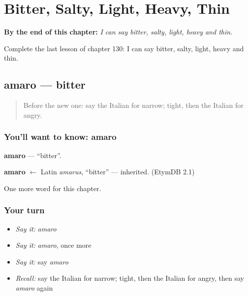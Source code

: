 
\chapter{Bitter, Salty, Light, Heavy, Thin}
\label{ch:it-bitter-salty-light-heavy-thin}

\begin{chapteropening}
\textbf{By the end of this chapter:} \emph{I can say bitter, salty, light, heavy and thin.}

Complete the last lesson of chapter 130: I can say bitter, salty, light, heavy and thin.
\end{chapteropening}

\section[amaro]{amaro — bitter}

\label{lesson:IT-C130-amaro}



\begin{quote}
Before the new one: say the Italian for narrow; tight, then the Italian for angry.
\end{quote}

\subsection*{You'll want to know: amaro}
\textbf{amaro} — \textquotedblleft{}bitter\textquotedblright{}.

\begin{cousinweb}
\textbf{amaro} $\leftarrow$ Latin \emph{amarus}, \textquotedblleft{}bitter\textquotedblright{} — inherited. (EtymDB 2.1)
\end{cousinweb}

\begin{grammarlens}[title={What you've built}]
One more word for this chapter.
\end{grammarlens}

\subsection*{Your turn}
\begin{itemize}
\raggedright
  \item \emph{Say it:} \emph{amaro}
  \item \emph{Say it:} \emph{amaro}, once more
  \item \emph{Say it:} say \emph{amaro}
  \item \emph{Recall:} say the Italian for narrow; tight, then the Italian for angry, then say \emph{amaro} again
\end{itemize}

